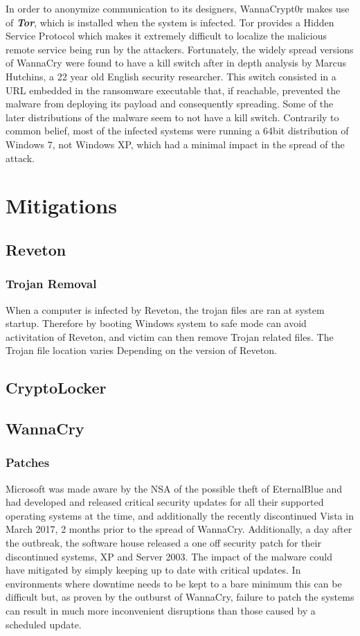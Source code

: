 \documentclass[10pt,a4paper]{article}
\begin{document}
In order to anonymize communication to its designers, WannaCrypt0r makes use of \textit{\textbf{Tor}}, which is installed when the system is infected. Tor provides a Hidden Service Protocol which makes it extremely difficult to localize the malicious remote service being run by the attackers.
Fortunately, the widely spread versions of WannaCry were found to have a kill switch after in depth analysis by Marcus Hutchins, a 22 year old English security researcher. This switch consisted in a URL  embedded in the ransomware executable that, if reachable, prevented the malware from deploying its payload and consequently spreading. Some of the later distributions of the malware seem to not have a kill switch. Contrarily to common belief, most of the infected systems were running a 64bit distribution of Windows 7, not Windows XP, which had a minimal impact in the spread of the attack.

\section{Mitigations}
\subsection{Reveton}
\subsubsection{Trojan Removal}
When a computer is infected by Reveton, the trojan files are ran at system startup. Therefore by booting Windows system to safe mode can avoid activitation of Reveton, and victim can then remove Trojan related files. The Trojan file location varies Depending on the version of Reveton.
\subsection{CryptoLocker}
\subsection{WannaCry}
\subsubsection{Patches}
Microsoft was made aware by the NSA of the possible theft of EternalBlue and had developed and released critical security updates for all their supported operating systems at the time, and additionally the recently discontinued Vista in March 2017, 2 months prior to the spread of WannaCry.
Additionally, a day after the outbreak, the software house released a one off security patch for their discontinued systems, XP and Server 2003.
The impact of the malware could have mitigated by simply keeping up to date with critical updates. In environments where downtime needs to be kept to a bare minimum this can be difficult but, as proven by the outburst of WannaCry, failure to patch the systems can result in much more inconvenient disruptions than those caused by a scheduled update.
\end{document}
